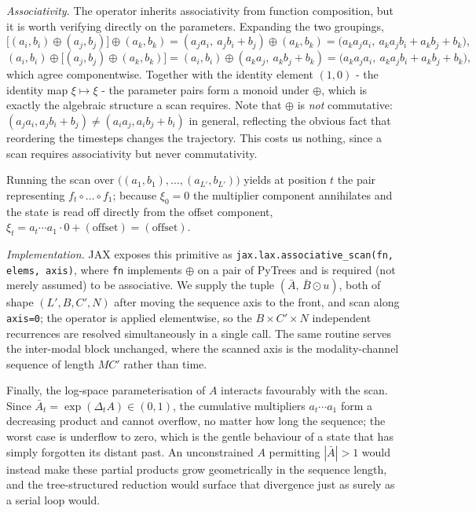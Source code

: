 \documentclass[11pt,a4paper]{article}
\begin{document}
\begin{enumerate}
	\textit{Associativity.} The operator inherits associativity from function composition, but it is worth verifying directly on the parameters. Expanding the two groupings,
	$$\bigl[(a_i,b_i) \oplus (a_j,b_j)\bigr] \oplus (a_k,b_k) = (a_j a_i,\ a_j b_i + b_j) \oplus (a_k,b_k) = \bigl(a_k a_j a_i,\ a_k a_j b_i + a_k b_j + b_k\bigr),$$
	$$(a_i,b_i) \oplus \bigl[(a_j,b_j) \oplus (a_k,b_k)\bigr] = (a_i,b_i) \oplus (a_k a_j,\ a_k b_j + b_k) = \bigl(a_k a_j a_i,\ a_k a_j b_i + a_k b_j + b_k\bigr),$$
	which agree componentwise. Together with the identity element $(1, 0)$ - the identity map $\xi \mapsto \xi$ - the parameter pairs form a monoid under $\oplus$, which is exactly the algebraic structure a scan requires. Note that $\oplus$ is \emph{not} commutative: $(a_j a_i, a_j b_i + b_j) \neq (a_i a_j, a_i b_j + b_i)$ in general, reflecting the obvious fact that reordering the timesteps changes the trajectory. This costs us nothing, since a scan requires associativity but never commutativity.
		
	Running the scan over $\bigl((a_1,b_1),\dots,(a_{L'},b_{L'})\bigr)$ yields at position $t$ the pair representing $f_t \circ \dots \circ f_1$; because $\xi_0 = 0$ the multiplier component annihilates and the state is read off directly from the offset component, $\xi_t = a_{t}\cdots a_1 \cdot 0 + (\text{offset}) = (\text{offset})$.
		
	\textit{Implementation.} JAX exposes this primitive as \texttt{jax.lax.associative\_scan(fn, elems, axis)}, where \texttt{fn} implements $\oplus$ on a pair of PyTrees and is required (not merely assumed) to be associative. We supply the tuple $(\bar{A},\, \bar{B} \odot u)$, both of shape $(L', B, C', N)$ after moving the sequence axis to the front, and scan along \texttt{axis=0}; the operator is applied elementwise, so the $B \times C' \times N$ independent recurrences are resolved simultaneously in a single call. The same routine serves the inter-modal block unchanged, where the scanned axis is the modality-channel sequence of length $MC'$ rather than time.
		
		Finally, the log-space parameterisation of $A$ interacts favourably with the scan. Since $\bar{A}_t = \exp(\Delta_t A) \in (0,1)$, the cumulative multipliers $a_t \cdots a_1$ form a decreasing product and cannot overflow, no matter how long the sequence; the worst case is underflow to zero, which is the gentle behaviour of a state that has simply forgotten its distant past. An unconstrained $A$ permitting $|\bar{A}| > 1$ would instead make these partial products grow geometrically in the sequence length, and the tree-structured reduction would surface that divergence just as surely as a serial loop would.


\end{enumerate}
\end{document}

